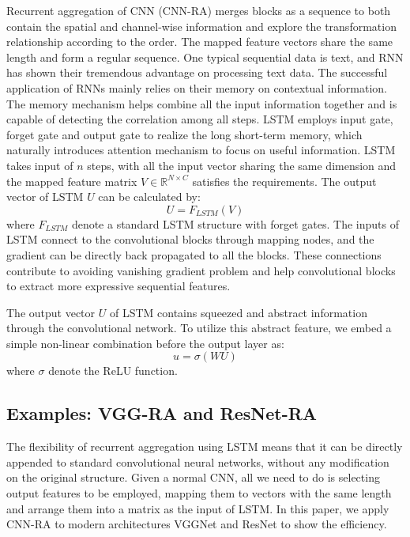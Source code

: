 \documentclass[runningheads]{llncs}
\begin{document}
Recurrent aggregation of CNN (CNN-RA) merges blocks as a sequence to both contain the spatial and channel-wise information and explore the transformation relationship according to the order. The mapped feature vectors share the same length and form a regular sequence. One typical sequential data is text, and RNN has shown their tremendous advantage on processing text data. The successful application of RNNs mainly relies on their memory on contextual information. The memory mechanism helps combine all the input information together and is capable of detecting the correlation among all steps. LSTM employs input gate, forget gate and output gate to realize the long short-term memory, which naturally introduces attention mechanism to focus on useful information. LSTM takes input of $n$ steps, with all the input vector sharing the same dimension and the mapped feature matrix $V\in \mathbb{R}^{N\times C}$ satisfies the requirements. The output vector of LSTM $U$ can be calculated by:
\begin{equation}
U = F_{LSTM}(V)
\end{equation}
where $F_{LSTM}$ denote a standard LSTM structure with forget gates. The inputs of LSTM connect to the convolutional blocks through mapping nodes, and the gradient can be directly back propagated to all the blocks. These connections contribute to avoiding vanishing gradient problem and help convolutional blocks to extract more expressive sequential features.

The output vector $U$ of LSTM contains squeezed and abstract information through the convolutional network. To utilize this abstract feature, we embed a simple non-linear combination before the output layer as:
\begin{equation}
u = \sigma(WU)
\end{equation}
where $\sigma$ denote the ReLU\cite{ReLU} function. 

\subsection{Examples: VGG-RA and ResNet-RA}
The flexibility of recurrent aggregation using LSTM means that it can be directly appended to standard convolutional neural networks, without any modification on the original structure. Given a normal CNN, all we need to do is selecting output features to be employed, mapping them to vectors with the same length and arrange them into a matrix as the input of LSTM. In this paper, we apply CNN-RA to modern architectures VGGNet and ResNet to show the efficiency.
\end{document}
